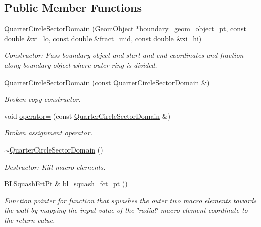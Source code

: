 \subsection*{Public Member Functions}
\begin{DoxyCompactItemize}
\item 
\hyperlink{classoomph_1_1QuarterCircleSectorDomain_accee19bdd94e0e3fe0d7c347ede685de}{Quarter\+Circle\+Sector\+Domain} (Geom\+Object $\ast$boundary\+\_\+geom\+\_\+object\+\_\+pt, const double \&xi\+\_\+lo, const double \&fract\+\_\+mid, const double \&xi\+\_\+hi)
\begin{DoxyCompactList}\small\item\em Constructor\+: Pass boundary object and start and end coordinates and fraction along boundary object where outer ring is divided. \end{DoxyCompactList}\item 
\hyperlink{classoomph_1_1QuarterCircleSectorDomain_a08d26f31016ef7b40e6bdadfc1eee29a}{Quarter\+Circle\+Sector\+Domain} (const \hyperlink{classoomph_1_1QuarterCircleSectorDomain}{Quarter\+Circle\+Sector\+Domain} \&)
\begin{DoxyCompactList}\small\item\em Broken copy constructor. \end{DoxyCompactList}\item 
void \hyperlink{classoomph_1_1QuarterCircleSectorDomain_a13bb4a1ac04f99ded56c398474676ce1}{operator=} (const \hyperlink{classoomph_1_1QuarterCircleSectorDomain}{Quarter\+Circle\+Sector\+Domain} \&)
\begin{DoxyCompactList}\small\item\em Broken assignment operator. \end{DoxyCompactList}\item 
\hyperlink{classoomph_1_1QuarterCircleSectorDomain_aea4997af819b532c8d8588123785950a}{$\sim$\+Quarter\+Circle\+Sector\+Domain} ()
\begin{DoxyCompactList}\small\item\em Destructor\+: Kill macro elements. \end{DoxyCompactList}\item 
\hyperlink{classoomph_1_1QuarterCircleSectorDomain_a6cffab57f87c9f4ab01744647240bb1e}{B\+L\+Squash\+Fct\+Pt} \& \hyperlink{classoomph_1_1QuarterCircleSectorDomain_ad8f22c0c3dc71c104465a24dac9b7c17}{bl\+\_\+squash\+\_\+fct\+\_\+pt} ()
\begin{DoxyCompactList}\small\item\em Function pointer for function that squashes the outer two macro elements towards the wall by mapping the input value of the \char`\"{}radial\char`\"{} macro element coordinate to the return value. \end{DoxyCompactList}\item 

\end{DoxyCompactItemize}
